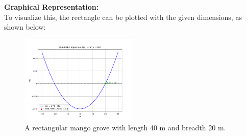 \documentclass[journal]{IEEEtran}
\begin{document}
\textbf{Graphical Representation:}\\
To visualize this, the rectangle can be plotted with the given dimensions, as shown below:
\begin{figure}[ht] %
    \centering
    \includegraphics[width=0.5\textwidth]{figs/Figure_1.png} %
    \caption{A rectangular mango grove with length 40 m and breadth 20 m.}
    \label{fig:mango_grove}
\end{figure}
\end{document}
